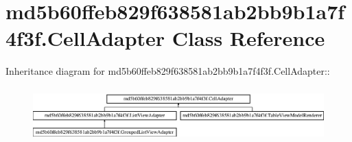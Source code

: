 \hypertarget{classmd5b60ffeb829f638581ab2bb9b1a7f4f3f_1_1_cell_adapter}{
\section{md5b60ffeb829f638581ab2bb9b1a7f4f3f.CellAdapter Class Reference}
\label{classmd5b60ffeb829f638581ab2bb9b1a7f4f3f_1_1_cell_adapter}
}
Inheritance diagram for md5b60ffeb829f638581ab2bb9b1a7f4f3f.CellAdapter::\begin{figure}[H]
\begin{center}
\leavevmode
\includegraphics[height=2.1cm]{classmd5b60ffeb829f638581ab2bb9b1a7f4f3f_1_1_cell_adapter}
\end{center}
\end{figure}
